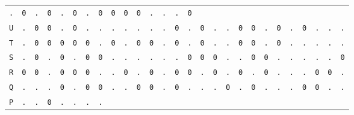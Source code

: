 \begin{figure}[H]
\begin{center}
{\begin{tabular}{c|cccccccccccccccccccccccccc}
				\texttt{.} & \texttt{0} & \texttt{.} & \texttt{0} &
				\texttt{.} & \texttt{0} & \texttt{.} & \texttt{0} &
				\texttt{0} & \texttt{0} & \texttt{0} & \texttt{.} &
				\texttt{.} & \texttt{.} & \texttt{0}                             \\
				\texttt{U} & \texttt{.} & \texttt{0} & \texttt{0} &
				\texttt{.} & \texttt{0} & \texttt{.} & \texttt{.} &
				\texttt{.} & \texttt{.} & \texttt{.} & \texttt{.} &
				\texttt{.} & \texttt{0} & \texttt{.} & \texttt{0} &
				\texttt{.} & \texttt{.} & \texttt{0} & \texttt{0} &
				\texttt{.} & \texttt{0} & \texttt{.} & \texttt{0} &
				\texttt{.} & \texttt{.} & \texttt{.}                             \\
				\texttt{T} & \texttt{.} & \texttt{0} & \texttt{0} &
				\texttt{0} & \texttt{0} & \texttt{0} & \texttt{.} &
				\texttt{0} & \texttt{.} & \texttt{0} & \texttt{0} &
				\texttt{.} & \texttt{0} & \texttt{.} & \texttt{0} &
				\texttt{.} & \texttt{.} & \texttt{0} & \texttt{0} &
				\texttt{.} & \texttt{0} & \texttt{.} & \texttt{.} &
				\texttt{.} & \texttt{.} & \texttt{.}                             \\
				\texttt{S} & \texttt{.} & \texttt{0} & \texttt{.} &
				\texttt{0} & \texttt{.} & \texttt{0} & \texttt{0} &
				\texttt{.} & \texttt{.} & \texttt{.} & \texttt{.} &
				\texttt{.} & \texttt{.} & \texttt{0} & \texttt{0} &
				\texttt{0} & \texttt{.} & \texttt{.} & \texttt{0} &
				\texttt{0} & \texttt{.} & \texttt{.} & \texttt{.} &
				\texttt{.} & \texttt{.} & \texttt{0}                             \\
				\texttt{R} & \texttt{0} & \texttt{0} & \texttt{.} &
				\texttt{0} & \texttt{0} & \texttt{0} & \texttt{.} &
				\texttt{.} & \texttt{0} & \texttt{.} & \texttt{0} &
				\texttt{.} & \texttt{0} & \texttt{0} & \texttt{.} &
				\texttt{0} & \texttt{.} & \texttt{0} & \texttt{.} &
				\texttt{0} & \texttt{.} & \texttt{.} & \texttt{.} &
				\texttt{0} & \texttt{0} & \texttt{.}                             \\
				\texttt{Q} & \texttt{.} & \texttt{.} & \texttt{.} &
				\texttt{0} & \texttt{.} & \texttt{0} & \texttt{0} &
				\texttt{.} & \texttt{.} & \texttt{0} & \texttt{0} &
				\texttt{.} & \texttt{0} & \texttt{.} & \texttt{.} &
				\texttt{.} & \texttt{0} & \texttt{.} & \texttt{0} &
				\texttt{.} & \texttt{.} & \texttt{.} & \texttt{0} &
				\texttt{0} & \texttt{.} & \texttt{.}                             \\
				\texttt{P} & \texttt{.} & \texttt{.} & \texttt{0} &
				\texttt{.} & \texttt{.} & \texttt{.} & \texttt{.} &

\end{tabular}}
\end{center}
\end{figure}
